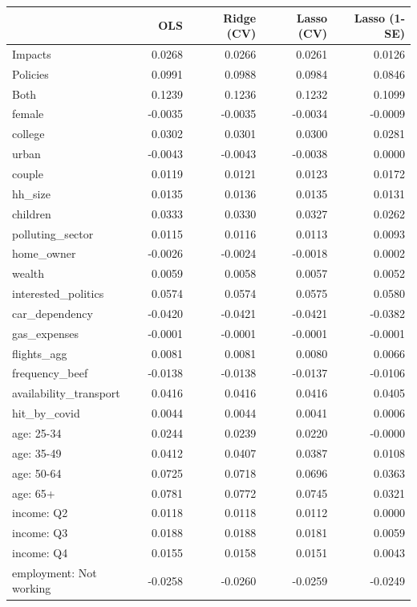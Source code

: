 \begin{tabular}{lrrrr}
\toprule
 & OLS & Ridge (CV) & Lasso (CV) & Lasso (1-SE) \\
\midrule
Impacts & 0.0268 & 0.0266 & 0.0261 & 0.0126 \\
Policies & 0.0991 & 0.0988 & 0.0984 & 0.0846 \\
Both & 0.1239 & 0.1236 & 0.1232 & 0.1099 \\
female & -0.0035 & -0.0035 & -0.0034 & -0.0009 \\
college & 0.0302 & 0.0301 & 0.0300 & 0.0281 \\
urban & -0.0043 & -0.0043 & -0.0038 & 0.0000 \\
couple & 0.0119 & 0.0121 & 0.0123 & 0.0172 \\
hh_size & 0.0135 & 0.0136 & 0.0135 & 0.0131 \\
children & 0.0333 & 0.0330 & 0.0327 & 0.0262 \\
polluting_sector & 0.0115 & 0.0116 & 0.0113 & 0.0093 \\
home_owner & -0.0026 & -0.0024 & -0.0018 & 0.0002 \\
wealth & 0.0059 & 0.0058 & 0.0057 & 0.0052 \\
interested_politics & 0.0574 & 0.0574 & 0.0575 & 0.0580 \\
car_dependency & -0.0420 & -0.0421 & -0.0421 & -0.0382 \\
gas_expenses & -0.0001 & -0.0001 & -0.0001 & -0.0001 \\
flights_agg & 0.0081 & 0.0081 & 0.0080 & 0.0066 \\
frequency_beef & -0.0138 & -0.0138 & -0.0137 & -0.0106 \\
availability_transport & 0.0416 & 0.0416 & 0.0416 & 0.0405 \\
hit_by_covid & 0.0044 & 0.0044 & 0.0041 & 0.0006 \\
age: 25-34 & 0.0244 & 0.0239 & 0.0220 & -0.0000 \\
age: 35-49 & 0.0412 & 0.0407 & 0.0387 & 0.0108 \\
age: 50-64 & 0.0725 & 0.0718 & 0.0696 & 0.0363 \\
age: 65+ & 0.0781 & 0.0772 & 0.0745 & 0.0321 \\
income: Q2 & 0.0118 & 0.0118 & 0.0112 & 0.0000 \\
income: Q3 & 0.0188 & 0.0188 & 0.0181 & 0.0059 \\
income: Q4 & 0.0155 & 0.0158 & 0.0151 & 0.0043 \\
employment: Not working & -0.0258 & -0.0260 & -0.0259 & -0.0249 \\

\end{tabular}
